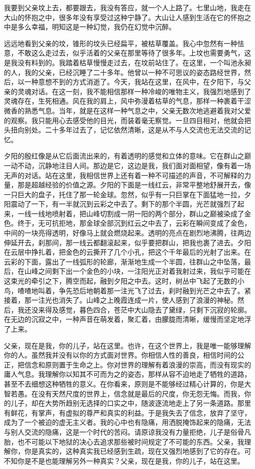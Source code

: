 \documentclass[12pt,oneside]{book}
\begin{document}
我要到父亲坟上去，都要跟去，我没有答应，就一个人上路了。七里山地，我走在大山的怀抱之中，很多年没有享受过这种宁静了。大山让人感到生活在它的怀抱之中是多么幸福，明知这是一种幻觉，我仍在幻觉中沉醉。

远远地看到父亲的坟，锥形的坟头已经扁平，被枯草覆盖。我心中忽然有一种怯意，不敢这么走过去，似乎活着的父亲在那里等待了很多年。上坟也需要勇气，这是我没有料到的。我踏着枯草慢慢走过去，在坟前站住了。在这里，一个叫池永昶的人，我的父亲，已经沉睡了二十多年。他曾以一种不可思议的姿态路经世界，然后，以一种意想不到的方式消逝了。今天，我站在这里，在风中，在夕阳下，与父亲的灵魂对话。在这一刻，我不能相信那样一种冷峻的唯物主义，我强烈地感到了灵魂存在，生死相通。风在我的肩上，风中弥漫着枯草的气息，那样一种裹着干涩微香的熟悉气息。当年，就是在这样一种气息之中，父亲无数次地逃避着我对父爱的观察。我只能用心去感受他的目光，而装着毫无察觉。一旦四目相对，他就会把头扭向别处。二十多年过去了，记忆依然清晰，这是从不与人交流也无法交流的记忆。

夕阳的殷红像是从它后面流出来的，有着透明的感觉和立体的意味。它在群山之巅一动不动，沉静地注目人间。那边是它，这边是我，我们面对面相望，像有着一场无声的对话。站在这里，我相信世界上还有着一种不可描述的声音，不可解释的力量，那是超越经验的价值之源。夕阳的下面是一线红云，非常平整地舒展开去，像一只巨大的盘子，托住了那一轮金球。忽然，似乎有一只巨掌在下面猛地一拉，夕阳震动了一下，有一半就沉到云彩之中去了。剩下的那个半圆，光芒就强烈了起来，一线一线地喷射着，把山峰切割成一阴一阳的两个部分，群山之巅被染成了金色。终于，无可抗拒地，那金球全部沉到红云之中去了，云彩在瞬间变成了金色，中间的一块亮得透明，好像马上就会燃烧起来。透明的亮点在剧烈地沸腾，往两边伸延开去，刹那间，那一线云都翻滚起来，似乎要把群山，把我也裹了进去。夕阳在云层中挣扎着，把金色的云撕开了几个小孔，把这个千年最后的光射了出来。在云彩的下面，露出了一线弧形的轮廊，渐渐地生成一个半圆，往群山之中坠落，最后，在山峰之间剩下出一个金色的小块，一注阳光正对着我射过来，我似乎可能在这束光的牵引之下，腾空而起，融到夕阳之中去。这时，树丛中飞起了无数的小鸟，喳喳地叫着，争先恐后地朝着那一注光飞了过去，刹时融到光芒之中去了。紧接着，那一注光也消失了。山峰之上晚霞连成一片，使人感到了浪漫的神秘。然后，我还没来得及感觉，暮色四合，苍茫中大山隐去了黛绿，只剩下沉寂的轮廓。在无边的沉寂之中，一种声音在萌发着，聚汇着，由朦胧而清晰，缓慢而坚定地浮了上来。

父亲，现在是我，你的儿子，站在这里。也许，在这个世界上，我是唯一能够理解你的人。虽然我并没有以你的方式面对世界。你相信人性的善良，相信时间的公正，把信念和原则置于生命之上。你对世界的理解有着浪漫的崇高，而没有现实的庸人气息。我理解你以知其不可而为之的姿态，那样从容不迫地走了牺牲的道路，甚至不去细想这种牺牲的意义。在你看来，原则是不能够经过精心计算的，你是大智若愚。在没有天然尺度的世界上，信念就是最后的尺度，你无怨无悔。而我，你的儿子，却在大势所趋别无选择的口实之中，随波逐流地走上了另一条道路。那里有鲜花，有掌声，有虚拟的尊严和真实的利益。于是我失去了信念，放弃了坚守，成为了一个被迫的虚无主义者。我的心中也有隐痛，用洒脱掩饰起来的隐痛，无法与别人交流的隐痛，这是一个时代的苦闷。请原谅我没有力量拒绝，儿子是俗骨凡胎，也不可能以下地狱的决心去追求那些被时间规定了不可能的东西。父亲，我理解你，你是真实的，这种真实我已经感到生疏，现在又强烈地感到了它的存在。可不知你是不是也能理解另外一种真实？父亲，现在是我，你的儿子，站在这里。
\end{document}
